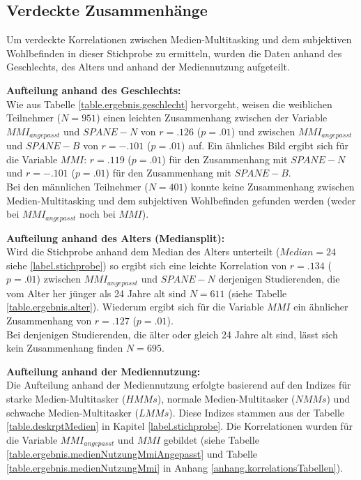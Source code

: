 \subsection{Verdeckte Zusammenhänge}
Um verdeckte Korrelationen zwischen Medien-Multitasking und dem subjektiven Wohlbefinden in dieser Stichprobe zu ermitteln, wurden die Daten anhand des Geschlechts, des Alters und anhand der Mediennutzung aufgeteilt. \par
\textbf{Aufteilung anhand des Geschlechts:} \\
Wie aus Tabelle \ref{table.ergebnis.geschlecht} hervorgeht, weisen die weiblichen Teilnehmer ($N=951$) einen leichten Zusammenhang zwischen der Variable $MMI_{angepasst}$ und $SPANE-N$ von $r=.126$ ($p=.01$) und zwischen  $MMI_{angepasst}$ und $SPANE-B$ von $r=-.101$ ($p=.01$) auf. Ein ähnliches Bild ergibt sich für die Variable $MMI$: $r=.119$ ($p=.01$) für den Zusammenhang mit $SPANE-N$ und $r=-.101$ ($p=.01$) für den Zusammenhang mit $SPANE-B$.\\
Bei den männlichen Teilnehmer ($N=401$) konnte keine Zusammenhang zwischen Medien-Multitasking und dem subjektiven Wohlbefinden gefunden werden (weder bei $MMI_{angepasst}$ noch bei $MMI$).\par
\textbf{Aufteilung anhand des Alters (Mediansplit):} \\
Wird die Stichprobe anhand dem Median des Alters unterteilt ($Median=24$ siehe \ref{label.stichprobe}) so ergibt sich eine leichte Korrelation von $r=.134$ ($p=.01$) zwischen $MMI_{angepasst}$ und $SPANE-N$ derjenigen Studierenden, die vom Alter her jünger als 24 Jahre alt sind $N=611$ (siehe Tabelle \ref{table.ergebnis.alter}). Wiederum ergibt sich für die Variable $MMI$ ein ähnlicher Zusammenhang von $r=.127$ ($p=.01$). \\
Bei denjenigen Studierenden, die älter oder gleich 24 Jahre alt sind, lässt sich kein Zusammenhang finden $N=695$.\par
\textbf{Aufteilung anhand der Mediennutzung:} \\
Die Aufteilung anhand der Mediennutzung erfolgte basierend auf den Indizes für starke Medien-Multitasker ($HMMs$), normale Medien-Multitasker ($NMMs$) und schwache Medien-Multitasker ($LMMs$). Diese Indizes stammen aus der Tabelle \ref{table.deskrptMedien} in Kapitel \ref{label.stichprobe}. Die Korrelationen wurden für die Variable $MMI_{angepasst}$ und $MMI$ gebildet (siehe Tabelle \ref{table.ergebnis.medienNutzungMmiAngepasst} und Tabelle \ref{table.ergebnis.medienNutzungMmi} in Anhang \ref{anhang.korrelationsTabellen}).\\
